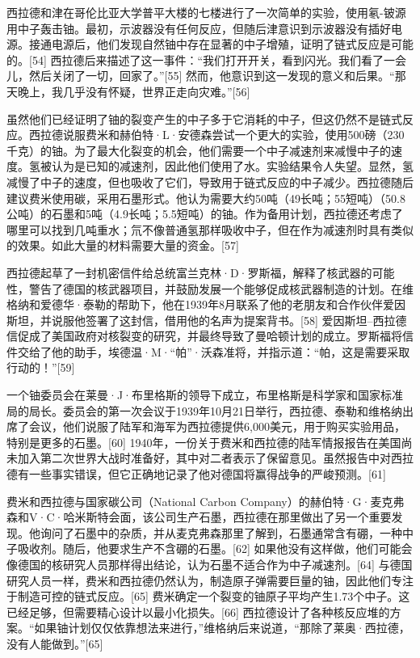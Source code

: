 西拉德和津在哥伦比亚大学普平大楼的七楼进行了一次简单的实验，使用氡-铍源用中子轰击铀。最初，示波器没有任何反应，但随后津意识到示波器没有插好电源。接通电源后，他们发现自然铀中存在显著的中子增殖，证明了链式反应是可能的。[54] 西拉德后来描述了这一事件：“我们打开开关，看到闪光。我们看了一会儿，然后关闭了一切，回家了。”[55] 然而，他意识到这一发现的意义和后果。“那天晚上，我几乎没有怀疑，世界正走向灾难。”[56]

虽然他们已经证明了铀的裂变产生的中子多于它消耗的中子，但这仍然不是链式反应。西拉德说服费米和赫伯特·L·安德森尝试一个更大的实验，使用500磅（230千克）的铀。为了最大化裂变的机会，他们需要一个中子减速剂来减慢中子的速度。氢被认为是已知的减速剂，因此他们使用了水。实验结果令人失望。显然，氢减慢了中子的速度，但也吸收了它们，导致用于链式反应的中子减少。西拉德随后建议费米使用碳，采用石墨形式。他认为需要大约50吨（49长吨；55短吨）（50.8公吨）的石墨和5吨（4.9长吨；5.5短吨）的铀。作为备用计划，西拉德还考虑了哪里可以找到几吨重水；氘不像普通氢那样吸收中子，但在作为减速剂时具有类似的效果。如此大量的材料需要大量的资金。[57]

西拉德起草了一封机密信件给总统富兰克林·D·罗斯福，解释了核武器的可能性，警告了德国的核武器项目，并鼓励发展一个能够促成核武器制造的计划。在维格纳和爱德华·泰勒的帮助下，他在1939年8月联系了他的老朋友和合作伙伴爱因斯坦，并说服他签署了这封信，借用他的名声为提案背书。[58] 爱因斯坦–西拉德信促成了美国政府对核裂变的研究，并最终导致了曼哈顿计划的成立。罗斯福将信件交给了他的助手，埃德温·M·“帕”·沃森准将，并指示道：“帕，这是需要采取行动的！”[59]

一个铀委员会在莱曼·J·布里格斯的领导下成立，布里格斯是科学家和国家标准局的局长。委员会的第一次会议于1939年10月21日举行，西拉德、泰勒和维格纳出席了会议，他们说服了陆军和海军为西拉德提供6,000美元，用于购买实验用品，特别是更多的石墨。[60] 1940年，一份关于费米和西拉德的陆军情报报告在美国尚未加入第二次世界大战时准备好，其中对二者表示了保留意见。虽然报告中对西拉德有一些事实错误，但它正确地记录了他对德国将赢得战争的严峻预测。[61]

费米和西拉德与国家碳公司（National Carbon Company）的赫伯特·G·麦克弗森和V·C·哈米斯特会面，该公司生产石墨，西拉德在那里做出了另一个重要发现。他询问了石墨中的杂质，并从麦克弗森那里了解到，石墨通常含有硼，一种中子吸收剂。随后，他要求生产不含硼的石墨。[62] 如果他没有这样做，他们可能会像德国的核研究人员那样得出结论，认为石墨不适合作为中子减速剂。[64] 与德国研究人员一样，费米和西拉德仍然认为，制造原子弹需要巨量的铀，因此他们专注于制造可控的链式反应。[65] 费米确定一个裂变的铀原子平均产生1.73个中子。这已经足够，但需要精心设计以最小化损失。[66] 西拉德设计了各种核反应堆的方案。“如果铀计划仅仅依靠想法来进行，”维格纳后来说道，“那除了莱奥·西拉德，没有人能做到。”[65]
